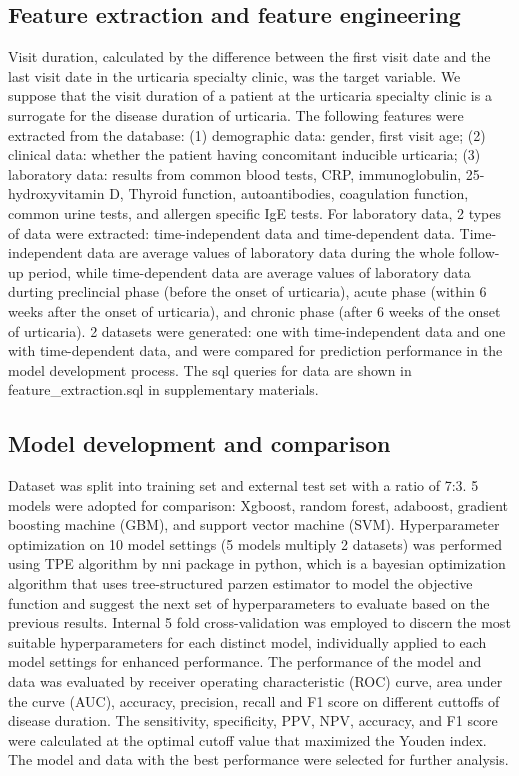 \documentclass[final,1p,times,authoryear]{elsarticle}
\begin{document}
\subsection{Feature extraction and feature engineering}\label{FeatureEngineering}
Visit duration, calculated by the difference between the first visit date and the last visit date in the urticaria specialty clinic, was the target variable. We suppose that the visit duration of a patient at the urticaria specialty clinic is a surrogate for the disease duration of urticaria.
The following features were extracted from the database: (1) demographic data: gender, first visit age; (2) clinical data: whether the patient having concomitant inducible urticaria; (3) laboratory data: results from common blood tests, CRP, immunoglobulin, 25-hydroxyvitamin D, Thyroid function, autoantibodies, coagulation function, common urine tests, and allergen specific IgE tests. 
For laboratory data, 2 types of data were extracted: time-independent data and time-dependent data. Time-independent data are average values of laboratory data during the whole follow-up period, while time-dependent data are average values of laboratory data durting preclincial phase (before the onset of urticaria), acute phase (within 6 weeks after the onset of urticaria), and chronic phase (after 6 weeks of the onset of urticaria). 2 datasets were generated: one with time-independent data and one with time-dependent data, and were compared for prediction performance in the model development process. The sql queries for data are shown in feature\_extraction.sql in supplementary materials. 

\subsection{Model development and comparison}\label{Training}
Dataset was split into training set and external test set with a ratio of 7:3. 5 models were adopted for comparison: Xgboost, random forest, adaboost, gradient boosting machine (GBM), and support vector machine (SVM). Hyperparameter optimization on 10 model settings (5 models multiply 2 datasets) was performed using TPE algorithm by nni package in python, which is a bayesian optimization algorithm that uses tree-structured parzen estimator to model the objective function and suggest the next set of hyperparameters to evaluate based on the previous results. Internal 5 fold cross-validation was employed to discern the most suitable hyperparameters for each distinct model, individually applied to each model settings for enhanced performance. The performance of the model and data was evaluated by receiver operating characteristic (ROC) curve, area under the curve (AUC), accuracy, precision, recall and F1 score on different cuttoffs of disease duration. The sensitivity, specificity, PPV, NPV, accuracy, and F1 score were calculated at the optimal cutoff value that maximized the Youden index. The model and data with the best performance were selected for further analysis.
\end{document}
